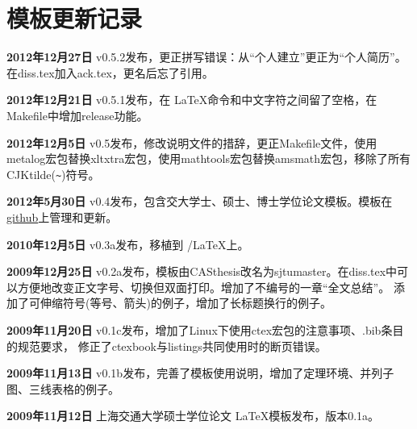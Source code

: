 
\chapter{模板更新记录}
\label{chap:updatelog}

\textbf{2012年12月27日} v0.5.2发布，更正拼写错误：从``个人建立''更正为``个人简历''。在diss.tex加入ack.tex，更名后忘了引用。

\textbf{2012年12月21日} v0.5.1发布，在 \LaTeX 命令和中文字符之间留了空格，在Makefile中增加release功能。

\textbf{2012年12月5日} v0.5发布，修改说明文件的措辞，更正Makefile文件，使用metalog宏包替换xltxtra宏包，使用mathtools宏包替换amsmath宏包，移除了所有CJKtilde(\verb+~+)符号。

\textbf{2012年5月30日} v0.4发布，包含交大学士、硕士、博士学位论文模板。模板在\href{https://github.com/weijianwen/sjtu-thesis-template-latex}{github}上管理和更新。

\textbf{2010年12月5日} v0.3a发布，移植到 \XeTeX/\LaTeX 上。

\textbf{2009年12月25日} v0.2a发布，模板由CASthesis改名为sjtumaster。在diss.tex中可以方便地改变正文字号、切换但双面打印。增加了不编号的一章``全文总结''。
添加了可伸缩符号(等号、箭头)的例子，增加了长标题换行的例子。

\textbf{2009年11月20日} v0.1c发布，增加了Linux下使用ctex宏包的注意事项、.bib条目的规范要求，
修正了ctexbook与listings共同使用时的断页错误。

\textbf{2009年11月13日} v0.1b发布，完善了模板使用说明，增加了定理环境、并列子图、三线表格的例子。

\textbf{2009年11月12日} 上海交通大学硕士学位论文 \LaTeX 模板发布，版本0.1a。

